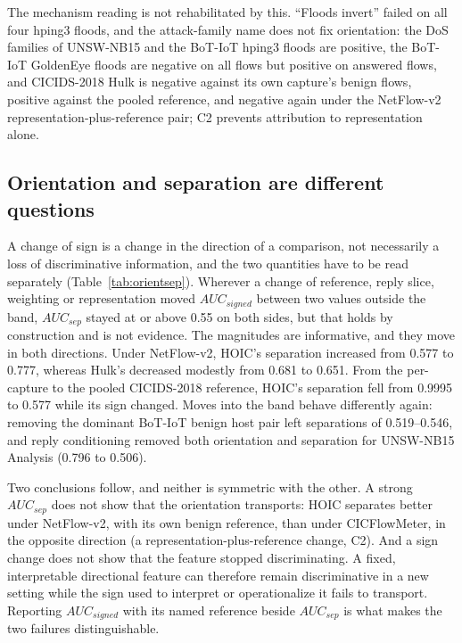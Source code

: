 \documentclass[preprint,12pt]{elsarticle}
\begin{document}
The mechanism reading is not rehabilitated by this. ``Floods invert'' failed on all four hping3 floods, and the attack-family name does not fix orientation: the DoS families of UNSW-NB15 and the BoT-IoT hping3 floods are positive, the BoT-IoT GoldenEye floods are negative on all flows but positive on answered flows, and CICIDS-2018 Hulk is negative against its own capture's benign flows, positive against the pooled reference, and negative again under the NetFlow-v2 representation-plus-reference pair; C2 prevents attribution to representation alone.

\subsection{Orientation and separation are different questions}\label{sec:disc-orientsep}

A change of sign is a change in the direction of a comparison, not necessarily a loss of discriminative information, and the two quantities have to be read separately (Table~\ref{tab:orientsep}). Wherever a change of reference, reply slice, weighting or representation moved $AUC_{signed}$ between two values outside the band, $AUC_{sep}$ stayed at or above 0.55 on both sides, but that holds by construction and is not evidence. The magnitudes are informative, and they move in both directions. Under NetFlow-v2, HOIC's separation increased from 0.577 to 0.777, whereas Hulk's decreased modestly from 0.681 to 0.651. From the per-capture to the pooled CICIDS-2018 reference, HOIC's separation fell from 0.9995 to 0.577 while its sign changed. Moves into the band behave differently again: removing the dominant BoT-IoT benign host pair left separations of 0.519--0.546, and reply conditioning removed both orientation and separation for UNSW-NB15 Analysis (0.796 to 0.506).

Two conclusions follow, and neither is symmetric with the other. A strong $AUC_{sep}$ does not show that the orientation transports: HOIC separates better under NetFlow-v2, with its own benign reference, than under CICFlowMeter, in the opposite direction (a representation-plus-reference change, C2). And a sign change does not show that the feature stopped discriminating. A fixed, interpretable directional feature can therefore remain discriminative in a new setting while the sign used to interpret or operationalize it fails to transport. Reporting $AUC_{signed}$ with its named reference beside $AUC_{sep}$ is what makes the two failures distinguishable.
\end{document}
